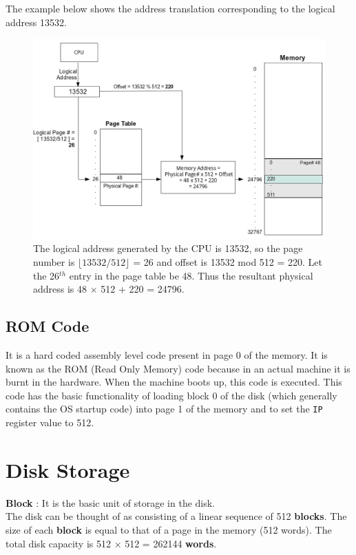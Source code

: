 \documentclass[11pt]{report}
\begin{document}
The example below shows the address translation corresponding to the logical address  13532.
\begin{figure}[ht]
	\centering
	\includegraphics[scale=0.35]{address_translation.png}
	\caption{ \small The logical address generated by the CPU is 13532, so the page number is $\lfloor 13532/512 \rfloor$ = 26 and offset is 13532 mod 512 = 220. Let the 26$^{th}$ entry in the page table be 48. Thus the resultant physical address is 48 $\times$ 512 + 220 = 24796.}
	\label{fig:paging}
\end{figure}


\section{ROM Code}
\label{lbl:romcode}
It is a hard coded assembly level code present in page 0 of the memory. It is known as the ROM (Read Only Memory) code because in an actual machine it is burnt in the hardware. When the machine boots up, this code is executed. This code has the basic functionality of loading block 0 of the disk (which generally contains the OS startup code) into page 1 of the memory and to set the \texttt{IP} register value to 512.



\chapter{Disk Storage}


\textbf{Block} : It is the basic unit of storage in the disk.\\

The disk can be thought of as consisting of a linear sequence of 512  \textbf{blocks}. The size of each \textbf{block} is equal to that of a page in the memory (512 words). The total disk capacity is 512 $\times$ 512 = 262144 \textbf{words}.\\
\end{document}
